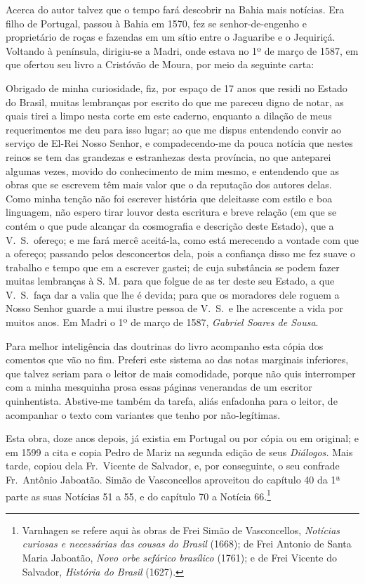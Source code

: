 Acerca do autor talvez que o tempo fará descobrir na Bahia mais 
notícias. Era filho de Portugal, passou à Bahia em 1570, fez 
se senhor-de-engenho e proprietário de roças e fazendas em um sítio 
entre o Jaguaribe e o Jequiriçá. Voltando à península, dirigiu-se a 
Madri, onde estava no 1º de março de 1587, em que ofertou seu livro a 
Cristóvão de Moura, por meio da seguinte carta: 
\begin{hedraquote}
Obrigado de minha curiosidade, fiz, por espaço de 17 anos que 
residi no Estado do Brasil, muitas lembranças por escrito do que me 
pareceu digno de notar, as quais tirei a limpo nesta corte em este 
caderno, enquanto a dilação de meus requerimentos me deu para isso 
lugar; ao que me dispus entendendo convir ao serviço de El-Rei Nosso 
Senhor, e compadecendo-me da pouca notícia que nestes reinos se tem 
das grandezas e estranhezas desta província, no que anteparei algumas 
vezes, movido do conhecimento de mim mesmo, e entendendo que as 
obras que se escrevem têm mais valor que o da reputação dos autores 
delas. Como minha tenção não foi escrever história que deleitasse com 
estilo e boa linguagem, não espero tirar louvor desta escritura e breve 
relação (em que se contém o que pude alcançar da cosmografia e 
descrição deste Estado), que a V.~S.~ofereço; e me fará mercê aceitá-la, 
como está merecendo a vontade com que a ofereço; passando pelos 
desconcertos dela, pois a confiança disso me fez suave o trabalho e 
tempo que em a escrever gastei; de cuja substância se podem fazer 
muitas lembranças à S. M. para que folgue de as ter deste seu Estado, a 
que V.~S.~faça dar a valia que lhe é devida; para que os moradores dele 
roguem a Nosso Senhor guarde a mui ilustre pessoa de V.~S.~e lhe acrescente a 
vida por muitos anos. Em Madri o 1º de março de 1587, \textit{Gabriel Soares de Sousa}. 
\end{hedraquote}

Para melhor inteligência das doutrinas do livro acompanho esta 
cópia dos comentos que vão no fim. Preferi este sistema ao das notas 
marginais inferiores, que talvez seriam para o leitor de mais 
comodidade, porque não quis interromper com a minha mesquinha 
prosa essas páginas venerandas de um escritor quinhentista. Abstive-me 
também da tarefa, aliás enfadonha para o leitor, de acompanhar o texto 
com variantes que tenho por não-legítimas. 

Esta obra, doze anos depois, já existia em Portugal ou por cópia ou 
em original; e em 1599 a cita e copia Pedro de Mariz na segunda edição 
de seus \textit{Diálogos.} Mais tarde, copiou dela Fr.~Vicente de Salvador, e, 
por conseguinte, o seu confrade Fr.~Antônio Jaboatão. Simão de 
Vasconcellos aproveitou do capítulo 40 da 1ª parte as suas Notícias 51 a 
55, e do capítulo 70 a Notícia 66.\footnote{ Varnhagen se refere aqui às obras de Frei 
Simão de Vasconcellos, \textit{Notícias curiosas e necessárias das cousas do Brasil} (1668); de 
Frei Antonio de Santa Maria Jaboatão, \textit{ Novo orbe sefárico brasílico} (1761); e de 
Frei Vicente do Salvador, \textit{ História do Brasil} (1627).}  

